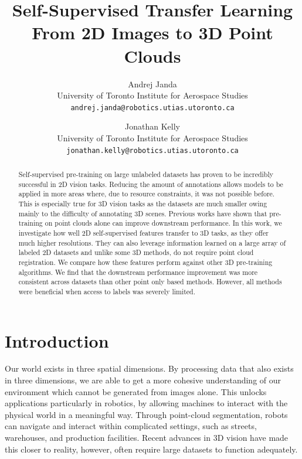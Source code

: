 \documentclass[10pt,twocolumn,letterpaper]{article}
\begin{document}
\title{Self-Supervised Transfer Learning From 2D Images to 3D Point Clouds}

\author{Andrej Janda\\
University of Toronto Institute for Aerospace Studies\\
{\tt\small andrej.janda@robotics.utias.utoronto.ca}
\and
Jonathan Kelly\\
University of Toronto Institute for Aerospace Studies\\
{\tt\small jonathan.kelly@robotics.utias.utoronto.ca}
}
\maketitle

\begin{abstract}
    Self-supervised pre-training on large unlabeled datasets has proven to be incredibly successful in 2D vision tasks. Reducing the amount of annotations allows models to be applied in more areas where, due to resource constraints, it was not possible before. This is especially true for 3D vision tasks as the datasets are much smaller owing mainly to the difficulty of annotating 3D scenes. Previous works have shown that pre-training on point clouds alone can improve downstream performance. In this work, we investigate how well 2D self-supervised features transfer to 3D tasks, as they offer much higher resolutions. They can also leverage information learned on a large array of labeled 2D datasets and unlike some 3D methods, do not require point cloud registration. We compare how these features perform against other 3D pre-training algorithms. We find that the downstream performance improvement was more consistent across datasets than other point only based methods. However, all methods were beneficial when access to labels was severely limited.
\end{abstract}

\section{Introduction}
\label{sec:intro}

Our world exists in three spatial dimensions. By processing data that also exists in three dimensions, we are able to get a more cohesive understanding of our environment which cannot be generated from images alone. This unlocks applications particularly in robotics, by allowing machines to interact with the physical world in a meaningful way. Through point-cloud segmentation, robots can navigate and interact within complicated settings, such as streets, warehouses, and production facilities. Recent advances in 3D vision have made this closer to reality, however, often require large datasets to function adequately.
\end{document}
